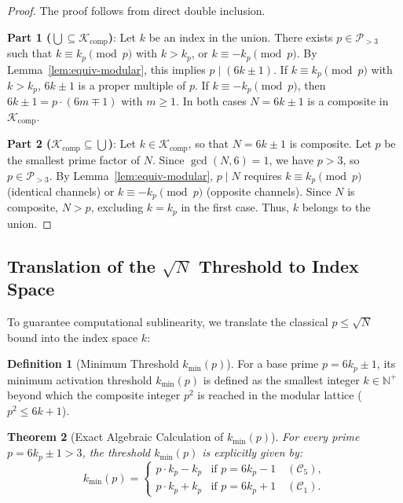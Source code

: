 \documentclass{article}
\numberwithin{equation}{section}
\theoremstyle{plain}
\newtheorem{theorem}{Theorem}[section]
\theoremstyle{definition}
\newtheorem{definition}[theorem]{Definition}
\begin{document}
\begin{proof}
The proof follows from direct double inclusion.

\noindent\textbf{Part 1 ($\bigcup \subseteq \mathcal{K}_{\text{comp}}$)}: Let $k$ be an index in the union. There exists $p \in \mathcal{P}_{>3}$ such that $k \equiv k_p \pmod p$ with $k > k_p$, or $k \equiv -k_p \pmod p$. By Lemma~\ref{lem:equiv-modular}, this implies $p \mid (6k \pm 1)$. If $k \equiv k_p \pmod p$ with $k > k_p$, $6k \pm 1$ is a proper multiple of $p$. If $k \equiv -k_p \pmod p$, then $6k \pm 1 = p \cdot (6m \mp 1)$ with $m \ge 1$. In both cases $N = 6k \pm 1$ is a composite in $\mathcal{K}_{\text{comp}}$.

\noindent\textbf{Part 2 ($\mathcal{K}_{\text{comp}} \subseteq \bigcup$)}: Let $k \in \mathcal{K}_{\text{comp}}$, so that $N = 6k \pm 1$ is composite. Let $p$ be the smallest prime factor of $N$. Since $\gcd(N, 6) = 1$, we have $p > 3$, so $p \in \mathcal{P}_{>3}$. By Lemma~\ref{lem:equiv-modular}, $p \mid N$ requires $k \equiv k_p \pmod p$ (identical channels) or $k \equiv -k_p \pmod p$ (opposite channels). Since $N$ is composite, $N > p$, excluding $k = k_p$ in the first case. Thus, $k$ belongs to the union.
\end{proof}

\subsection{Translation of the $\sqrt{N}$ Threshold to Index Space}

To guarantee computational sublinearity, we translate the classical $p \le \sqrt{N}$ bound into the index space $k$:

\begin{definition}[Minimum Threshold $k_{\min}(p)$]
\label{def:umin}
For a base prime $p = 6k_p \pm 1$, its minimum activation threshold $k_{\min}(p)$ is defined as the smallest integer $k \in \mathbb{N}^+$ beyond which the composite integer $p^2$ is reached in the modular lattice ($p^2 \le 6k + 1$).
\end{definition}

\begin{theorem}[Exact Algebraic Calculation of $k_{\min}(p)$]
\label{thm:calculo-kmin}
For every prime $p = 6k_p \pm 1 > 3$, the threshold $k_{\min}(p)$ is explicitly given by:
\begin{equation}
k_{\min}(p) = 
\begin{cases}
p \cdot k_p - k_p & \text{if } p = 6k_p - 1 \quad (\mathcal{C}_5), \\
p \cdot k_p + k_p & \text{if } p = 6k_p + 1 \quad (\mathcal{C}_1).
\end{cases}
\end{equation}
\end{theorem}
\end{document}
